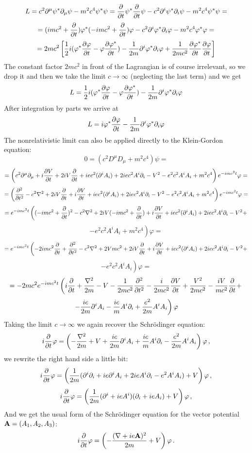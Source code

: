 $$L=c^2\partial^\mu\psi^*\partial_\mu\psi-m^2c^4\psi^*\psi=
{\partial\over\partial t}\psi^*{\partial\over\partial t}\psi
-c^2\partial^i\psi^*\partial_i\psi-m^2c^4\psi^*\psi=$$
$$=(imc^2+{\partial\over\partial t})\varphi^*
(-imc^2+{\partial\over\partial t})\varphi
-c^2\partial^i\varphi^*\partial_i\varphi-m^2c^4\varphi^*\varphi=$$
$$=2mc^2\left[{1\over2}i(\varphi^*{\partial\varphi\over\partial t}-
\varphi{\partial\varphi^*\over\partial t})-
{1\over2m}\partial^i\varphi^*\partial_i\varphi
+{1\over2mc^2}{\partial\varphi^*\over\partial t}
{\partial\varphi\over\partial t}\right]$$
The constant factor $2mc^2$ in front of the Lagrangian is of course irrelevant,
so we drop it and then we take the limit $c\to\infty$ (neglecting the last
term) and we get
$$L={1\over2}i(\varphi^*{\partial\varphi\over\partial t}-
\varphi{\partial\varphi^*\over\partial t})-
{1\over2m}\partial^i\varphi^*\partial_i\varphi
$$
After integration by parts we arrive at
$$L=i\varphi^*{\partial\varphi\over\partial t}
-{1\over 2m}\partial^i\varphi^*\partial_i
\varphi$$
The nonrelativistic limit can also be applied directly to the Klein-Gordon equation:
$$0=(c^2D^\mu D_\mu+m^2c^4)\psi=$$
$$=\left(
c^2\partial^\mu\partial_\mu
+i{\partial V\over\partial t}
+2iV{\partial\over\partial t}
+iec^2(\partial^i A_i)
+2iec^2A^i\partial_i
-V^2
-e^2c^2A^iA_i
+m^2c^4
\right)e^{-imc^2t}\varphi=
$$
$$=\left(
{\partial^2\over\partial t^2}
-c^2\nabla^2
+2iV{\partial\over\partial t}
+i{\partial V\over\partial t}
+iec^2(\partial^i A_i)
+2iec^2A^i\partial_i
-V^2
-e^2c^2A^iA_i
+m^2c^4
\right)e^{-imc^2t}\varphi=
$$
$$=e^{-imc^2t}\left(
(-imc^2+{\partial\over\partial t})^2
-c^2\nabla^2
+2iV(-imc^2+{\partial\over\partial t})
+i{\partial V\over\partial t}
+iec^2(\partial^i A_i)
+2iec^2A^i\partial_i
-V^2+ \right.
$$
$$\left.
-e^2c^2A^iA_i
+m^2c^4
\right)\varphi=
$$
$$=e^{-imc^2t}\left(
-2imc^2{\partial\over\partial t}+{\partial^2\over\partial t^2}
-c^2\nabla^2
+2Vmc^2
+2iV{\partial\over\partial t}
+i{\partial V\over\partial t}
+iec^2(\partial^i A_i)
+2iec^2A^i\partial_i
-V^2+ \right.
$$
$$\left.
-e^2c^2A^iA_i
\right)\varphi=
$$
$$=
-2mc^2 e^{-imc^2 t} \left(i{\partial\over\partial t}+{\nabla^2\over2m}-V
-{1\over2mc^2}{\partial^2\over\partial t^2}-{i\over2mc^2}{\partial
V\over\partial t}+{V^2\over2mc^2}-{iV\over mc^2}{\partial\over\partial
t}+\right.$$
$$\left.-{ie\over2m}\partial^i A_i-{ie\over
m}A^i\partial_i+{e^2\over2m}A^iA_i\right)\varphi
$$
Taking the limit $c\to\infty$ we again recover the Schr\"odinger equation:
$$i{\partial\over\partial t}\varphi=\left(-{\nabla^2\over2
m}+V
+{ie\over2m}\partial^i A_i
+{ie\over m}A^i\partial_i
-{e^2\over2m}A^iA_i
\right)\varphi\,,$$
we rewrite the right hand side a little bit:
$$i{\partial\over\partial t}\varphi=\left({1\over2 m}
(\partial^i\partial_i
+ie\partial^i A_i
+2ieA^i\partial_i
-e^2A^iA_i
)
+V
\right)\varphi\,,$$
$$i{\partial\over\partial t}\varphi=\left({1\over2 m}
(\partial^i+ieA^i)(\partial_i+ieA_i)
+V
\right)\varphi\,,$$
And we get the usual form of the Schr\"odinger equation for the vector
potential ${\bf A}=(A_1, A_2, A_3)$:
$$i{\partial\over\partial t}\varphi=\left(-{(\nabla+ie{\bf A})^2\over2 m}
+V \right)\varphi\,.$$
